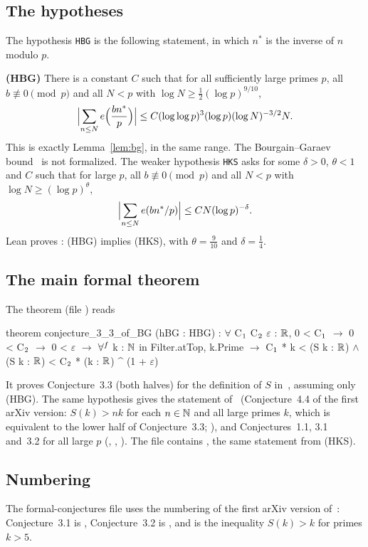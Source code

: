 \subsection*{The hypotheses}
The hypothesis \texttt{HBG} is the following statement, in which $n^*$ is the inverse of $n$ modulo $p$.

\smallskip
\noindent\textbf{(HBG)} There is a constant $C$ such that for all sufficiently large primes $p$, all $b\not\equiv0\pmod p$ and all $N<p$ with $\log N\ge\frac12(\log p)^{9/10}$,
\[
\Bigl|\sum_{n\le N}e\Bigl(\frac{bn^*}p\Bigr)\Bigr|\le C(\log\log p)^3(\log p)(\log N)^{-3/2}N .
\]
This is exactly Lemma~\ref{lem:bg}, in the same range. The Bourgain--Garaev bound~\cite[Theorem~16]{b8} is not formalized. The weaker hypothesis \texttt{HKS} asks for some $\delta>0$, $\theta<1$ and $C$ such that for large $p$, all $b\not\equiv0\pmod p$ and all $N<p$ with $\log N\ge(\log p)^\theta$,
\[
\Bigl|\sum_{n\le N}e(bn^*/p)\Bigr|\le CN(\log p)^{-\delta}.
\]
Lean proves : (HBG) implies (HKS), with $\theta=\frac9{10}$ and $\delta=\frac14$.

\subsection*{The main formal theorem}
The theorem  (file ) reads
\begin{leancode}
theorem conjecture_3_3_of_BG (hBG : HBG) : $\forall$ C$\sb{1}$ C$\sb{2}$ $\varepsilon$ : $\mathbb{R}$, 0 < C$\sb{1}$ $\to$ 0 < C$\sb{2}$ $\to$ 0 < $\varepsilon$ $\to$
    $\forall\sp{f}$ k : $\mathbb{N}$ in Filter.atTop, k.Prime $\to$
      C$\sb{1}$ * k < (S k : $\mathbb{R}$) $\wedge$ (S k : $\mathbb{R}$) < C$\sb{2}$ * (k : $\mathbb{R}$) ^ (1 + $\varepsilon$)
\end{leancode}
It proves Conjecture~3.3 (both halves) for the definition of $S$ in~\cite{b11}, assuming only (HBG). The same hypothesis gives the statement  of~\cite{b11} (Conjecture~4.4 of the first arXiv version: $S(k)>nk$ for each $n\in\mathbb{N}$ and all large primes $k$, which is equivalent to the lower half of Conjecture~3.3; ), and Conjectures~1.1, 3.1 and~3.2 for all large $p$ (, , ). The file  contains , the same statement from (HKS).

\subsection*{Numbering}
The formal-conjectures file uses the numbering of the first arXiv version of~\cite{b1}: Conjecture~3.1 is , Conjecture~3.2 is , and  is the inequality $S(k)>k$ for primes $k>5$.

